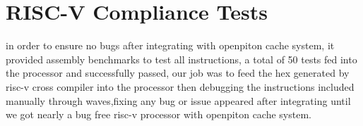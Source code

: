 \documentclass[../main.tex]{subfiles}
\begin{document}
\section{RISC-V Compliance Tests}
in order to ensure no bugs after integrating with openpiton cache system, it provided assembly benchmarks to test all instructions, a total of 50 tests fed into the processor and successfully passed,
our job was to feed the hex generated by risc-v  cross compiler into the processor then debugging the instructions included manually through waves,fixing any bug or issue appeared after integrating until we got nearly a bug free risc-v processor with openpiton cache system.
\end{document}
